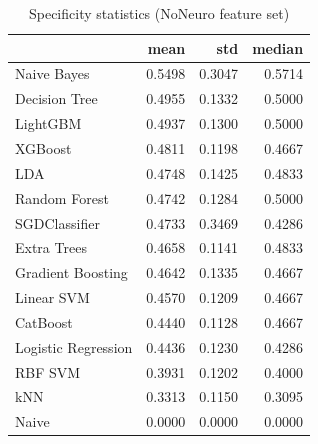 \begin{table}
\caption{Specificity statistics (NoNeuro feature set)}
\label{tab:specificity_NoNeuro_stats}
\begin{tabular}{lrrr}
\toprule
 & mean & std & median \\
\midrule
Naive Bayes & 0.5498 & 0.3047 & 0.5714 \\
Decision Tree & 0.4955 & 0.1332 & 0.5000 \\
LightGBM & 0.4937 & 0.1300 & 0.5000 \\
XGBoost & 0.4811 & 0.1198 & 0.4667 \\
LDA & 0.4748 & 0.1425 & 0.4833 \\
Random Forest & 0.4742 & 0.1284 & 0.5000 \\
SGDClassifier & 0.4733 & 0.3469 & 0.4286 \\
Extra Trees & 0.4658 & 0.1141 & 0.4833 \\
Gradient Boosting & 0.4642 & 0.1335 & 0.4667 \\
Linear SVM & 0.4570 & 0.1209 & 0.4667 \\
CatBoost & 0.4440 & 0.1128 & 0.4667 \\
Logistic Regression & 0.4436 & 0.1230 & 0.4286 \\
RBF SVM & 0.3931 & 0.1202 & 0.4000 \\
kNN & 0.3313 & 0.1150 & 0.3095 \\
Naive & 0.0000 & 0.0000 & 0.0000 \\
\bottomrule
\end{tabular}
\end{table}
